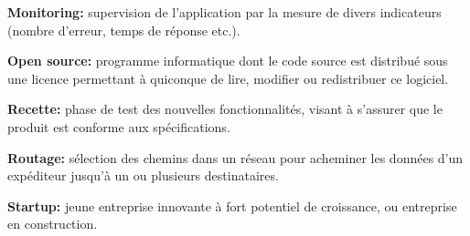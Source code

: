 \bigskip

\textbf{Monitoring:} supervision de l'application par la mesure de
divers indicateurs (nombre d'erreur, temps de réponse etc.).

\bigskip

\textbf{Open source:} programme informatique dont le code source est
distribué sous une licence permettant à quiconque de lire, modifier ou
redistribuer ce logiciel.

\bigskip

\textbf{Recette:} phase de test des nouvelles fonctionnalités, visant à
s'assurer que le produit est conforme aux spécifications.

\bigskip

\textbf{Routage:} sélection des chemins dans un réseau pour acheminer
les données d'un expéditeur jusqu'à un ou plusieurs destinataires.

\bigskip

\textbf{Startup:} jeune entreprise innovante à fort potentiel de
croissance, ou entreprise en construction.
